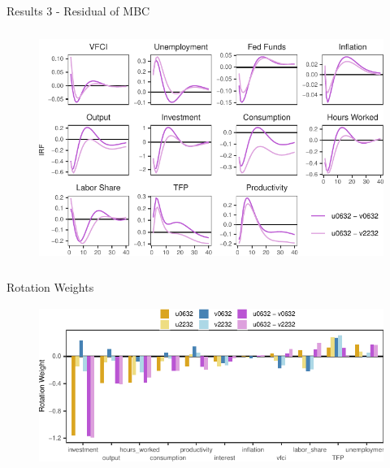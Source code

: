 \begin{frame}{Results 3 - Residual of MBC }
    
    \label{results-3}

    \vspace{-0.25cm}

    \begin{figure}
        \includegraphics[height = 3in]{figs/fig6_resid_MBC.pdf}
    \end{figure}
    

\end{frame}


\begin{frame}{Rotation Weights }
    
    \vspace{-0.25cm}
    
    \begin{figure}
        \includegraphics[height = 2in]{figs/fig7_weights.pdf}
    \end{figure}

\end{frame}

